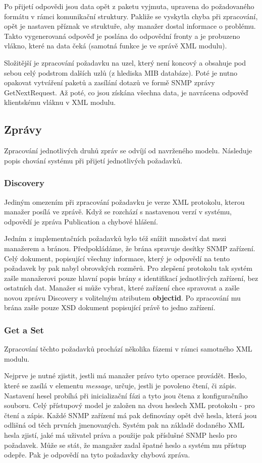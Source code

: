 Po přijetí odpovědi jsou data opět z paketu vyjmuta, upravena do požadovaného formátu v rámci komunikační struktury. Pakliže se vyskytla chyba při zpracování, opět
je nastaven příznak ve struktuře, aby manažer dostal informace o problému. Takto vygenerovaná odpověď je poslána do odpovědní fronty a je probuzeno vlákno, které na
data čeká (samotná funkce je ve správě XML modulu).

Složitější je zpracování požadavku na uzel, který není koncový a obsahuje pod sebou celý podstrom dalších uzlů (z hlediska MIB databáze). Poté je nutno opakovat
vytváření paketů a zasílání dotazů ve formě SNMP zprávy GetNextRequest. Až poté, co jsou získána všechna data, je navrácena odpověď klientskému vláknu v XML modulu.


\subsection{Zprávy}
Zpracování jednotlivých druhů zpráv se odvíjí od navrženého modelu. Následuje popis chování systému při přijetí jednotlivých požadavků.

\subsubsection*{Discovery}
Jediným omezením při zpracování požadavku je verze XML protokolu, kterou manažer posílá ve zprávě. Když se rozchází s nastavenou 
verzí v systému, odpovědí je zpráva Publication a chybové hlášení.

Jedním z implementačních požadavků bylo též snížit množství dat mezi manažerem a bránou. Předpokládáme, že brána spravuje
desítky SNMP zařízení. Celý dokument, popisující všechny informace, který je odpovědí na tento požadavek by pak nabyl
obrovských rozměrů. Pro zlepšení protokolu tak systém zašle manažerovi pouze hlavní popis brány s identifikací jednotlivých zařízení, bez ostatních dat.
Manažer si může vybrat, které zařízení chce spravovat a zašle novou zprávu Discovery s volitelným atributem \textbf{objectid}. Po zpracování
mu brána zašle pouze XSD dokument popisující právě to jedno zařízení.

\subsubsection*{Get a Set}
Zpracování těchto požadavků prochází několika fázemi v rámci samotného XML modulu.

Nejprve je nutné zjistit, jestli má manažer právo tyto operace provádět. Heslo, které se zasílá v elementu \textit{message}, určuje, jestli je
povoleno čtení, či zápis. Nastavení hesel probíhá při inicializační fázi a tyto jsou čtena z konfiguračního souboru. Celý přístupový model je
založen na dvou heslech XML protokolu - pro čtení a zápis. Každé SNMP zařízení má pak definovány opět dvě hesla, která jsou odlišná od těch prvních jmenovaných.
Systém pak na základě dodaného XML hesla zjistí, jaké má uživatel práva a použije pak příslušné SNMP heslo pro požadavek. Může se stát, že mangažer zadal
špatné heslo a systém mu přístup odepře. Pak je odpovědí na tyto požadavky chybová zpráva.

